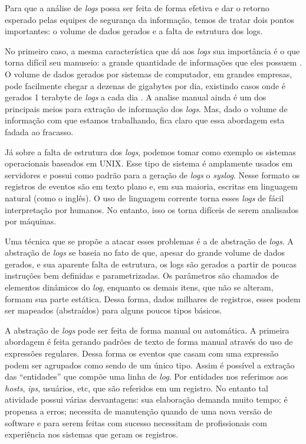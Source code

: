 \documentclass[
	12pt,				%
	openright,			%
	twoside,			%
	a4paper,			%
	english,			%
	spanish,			%
	brazil,				%
	]{abntex2}
\begin{document}
Para que a análise de \emph{logs} possa ser feita de forma efetiva e dar o retorno esperado pelas equipes de segurança da informação, temos de tratar dois pontos importantes: o volume de dados gerados e a falta de estrutura dos logs.

No primeiro caso, a mesma característica que dá aos \emph{logs} sua importância é o que torna difícil seu manuseio: a grande quantidade de informações que eles possuem \cite{brugger2001data,miranskyy2016data,nagappan2010abstracting,vaarandi2003data}. O volume de dados gerados por sistemas de computador, em grandes empresas, pode facilmente chegar a dezenas de gigabytes por dia, existindo casos onde é gerados 1 terabyte de \emph{logs} a cada dia \cite{yen2013beehive}. A analise manual ainda é um dos principais meios para extração de informação dos \emph{logs}. Mas, dado o volume de informação com que estamos trabalhando, fica claro que essa abordagem esta fadada ao fracasso.

Já sobre a falta de estrutura dos \emph{logs}, podemos tomar como exemplo os sistemas operacionais baseados em UNIX\texttrademark. Esse tipo de sistema é amplamente usados em servidores \cite{w3techs-osusage} e possui como padrão para a geração de \emph{logs} o \emph{syslog}. Nesse formato os registros de eventos são em texto plano e, em sua maioria, escritas em linguagem natural (como o inglês). O uso de linguagem corrente torna esses \emph{logs} de fácil interpretação por humanos. No entanto, isso os torna difíceis de serem analisados por máquinas.

Uma técnica que se propõe a atacar esses problemas é a de abstração de \emph{logs}. A abstração de \emph{logs} se baseia no fato de que, apesar do grande volume de dados gerados, e sua aparente falta de estrutura, os logs são gerados a partir de poucas instruções bem definidas e parametrizadas. Os parâmetros são chamados de elementos dinâmicos do \emph{log}, enquanto os demais itens, que não se alteram, formam sua parte estática. Dessa forma, dados milhares de registros, esses podem ser mapeados (abstraídos) para alguns poucos tipos básicos.

A abstração de \emph{logs} pode ser feita de forma manual ou automática. A primeira abordagem é feita gerando padrões de texto de forma manual através do uso de expressões regulares. Dessa forma os eventos que casam com uma expressão podem ser agrupados como sendo de um único tipo. Assim é possível a extração das ``entidades'' que compõe uma linha de \emph{log}. Por entidades nos referimos aos \emph{hosts}, \emph{ips}, usuários, etc, que são referidos em um registro. No entanto tal atividade possui várias desvantagens: sua elaboração demanda muito tempo; é propensa a erros; necessita de manutenção quando de uma nova versão de software e para serem feitas com sucesso necessitam de profissionais com experiência nos sistemas que geram os registros.
\end{document}
